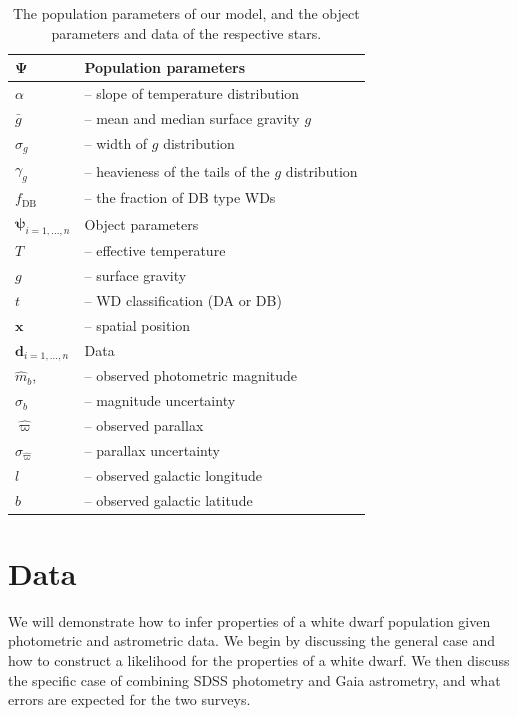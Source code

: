 \documentclass[fleqn,usenatbib]{mnras}
\newcommand{\popp}{\boldsymbol{\Psi}}
\newcommand{\objp}{\boldsymbol{\psi}}
\newcommand{\data}{\mathbf{d}}
\newcommand{\Teff}{T}
\newcommand{\logg}{g}
\begin{document}
\begin{table}
	\centering
	\caption{The population parameters of our model, and the object parameters and data of the respective stars.}
	\label{tab:parameters}
    \begin{tabular}{l l}
		\hline
		$\popp$  & Population parameters \\
		\hline
		$\alpha$ & -- slope of temperature distribution \\
		$\bar{g}$ & -- mean and median surface gravity $\logg$ \\
		$\sigma_g$ & -- width of $\logg$ distribution \\
		$\gamma_g$ & -- heavieness of the tails of the $\logg$ distribution \\
		$f_\text{DB}$ & -- the fraction of DB type WDs \\
        \hline
        $\objp_{i=1,...,n}$  & Object parameters \\
        \hline
        $\Teff$ & -- effective temperature \\
        $\logg$ & -- surface gravity \\
        $t$ & -- WD classification (DA or DB) \\
        $\mathbf{x}$ & -- spatial position  \\
        \hline
        $\data_{i=1,...,n}$ & Data \\
        \hline
        $\hat{m}_b$,& -- observed photometric magnitude \\
        $\sigma_b$ & -- magnitude uncertainty \\
        $\hat{\varpi}$ & -- observed parallax \\
        $\sigma_{\hat{\varpi}}$ & -- parallax uncertainty \\
        $l$ & -- observed galactic longitude \\
        $b$ & -- observed galactic latitude \\
		\hline
	\end{tabular}
\end{table}




\section{Data}\label{sec:data}

We will demonstrate how to infer properties of a white dwarf population given photometric and astrometric data. We begin by discussing the general case and how to construct a likelihood for the properties of a white dwarf. We then discuss the specific case of combining SDSS photometry and Gaia astrometry, and what errors are expected for the two surveys.
\end{document}
